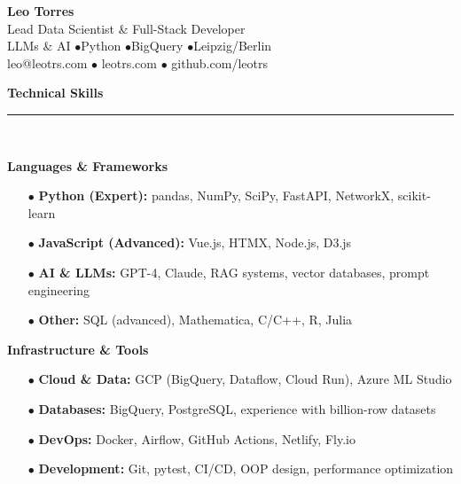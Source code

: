 \documentclass[11pt,a4paper]{article}
\newcommand{\sectiondivider}{%
    \vspace{2pt}\\%
    {\color{coral}\rule{30pt}{2pt}}\\%
    \vspace{8pt}%
}
\newcommand{\coralbullet}{{\color{coral}$\bullet$}\space}
\newcommand{\cvsectioncustom}[1]{%
    \vspace{12pt}%
    {\Large\color{navy}\textbf{#1}}%
    \sectiondivider%
}
\begin{document}
\color{charcoal}

\begin{center}
    {\Huge\color{navy}\textbf{Leo Torres}}\\[8pt]
    {\large\color{mediumgray}Lead Data Scientist \& Full-Stack Developer}\\[4pt]
    {LLMs \& AI \coralbullet Python \coralbullet BigQuery \coralbullet Leipzig/Berlin}\\[12pt]
    {\small
        leo@leotrs.com \coralbullet 
        leotrs.com \coralbullet 
        github.com/leotrs
    }\\[8pt]
\end{center}

\vspace{15pt}

\cvsectioncustom{Technical Skills}

\textbf{Languages \& Frameworks}
\begin{itemize}[leftmargin=15pt,itemsep=2pt]
    \item[\coralbullet] \textbf{Python (Expert):} pandas, NumPy, SciPy, FastAPI, NetworkX, scikit-learn
    \item[\coralbullet] \textbf{JavaScript (Advanced):} Vue.js, HTMX, Node.js, D3.js
    \item[\coralbullet] \textbf{AI \& LLMs:} GPT-4, Claude, RAG systems, vector databases, prompt engineering
    \item[\coralbullet] \textbf{Other:} SQL (advanced), Mathematica, C/C++, R, Julia
\end{itemize}

\vspace{6pt}
\textbf{Infrastructure \& Tools}
\begin{itemize}[leftmargin=15pt,itemsep=2pt]
    \item[\coralbullet] \textbf{Cloud \& Data:} GCP (BigQuery, Dataflow, Cloud Run), Azure ML Studio
    \item[\coralbullet] \textbf{Databases:} BigQuery, PostgreSQL, experience with billion-row datasets
    \item[\coralbullet] \textbf{DevOps:} Docker, Airflow, GitHub Actions, Netlify, Fly.io
    \item[\coralbullet] \textbf{Development:} Git, pytest, CI/CD, OOP design, performance optimization
\end{itemize}
\end{document}
